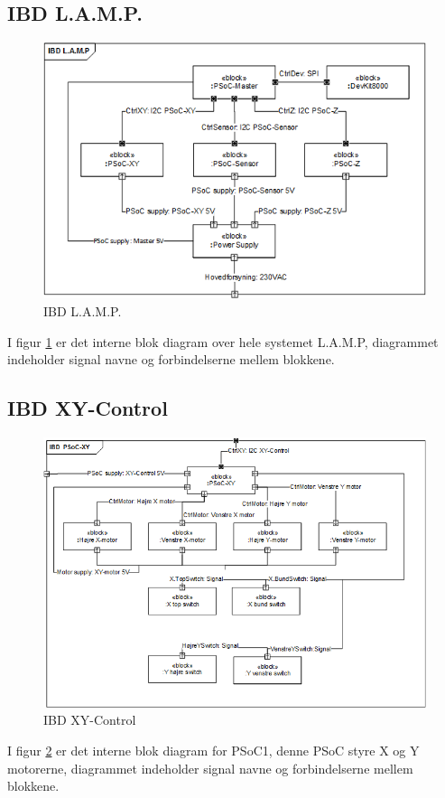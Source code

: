 \subsection{IBD L.A.M.P.}
\begin{figure}[H] \centering
    \includegraphics[width=\textwidth]{0_Filer/Figuer/5_HW_Design/IBD_LAMP_vers3.png}
    \caption{IBD L.A.M.P.}
    \label{fig:ibdLAMP}
\end{figure}
I figur \ref{fig:ibdLAMP} er det interne blok diagram over hele systemet L.A.M.P, diagrammet indeholder signal navne og forbindelserne mellem blokkene.

\subsection{IBD XY-Control}
\begin{figure}[H] \centering
    \includegraphics[width=\textwidth]{0_Filer/Figuer/5_HW_Design/IBD_PSoC1_vers3.png}
    \caption{IBD XY-Control}
    \label{fig:ibdXY}
\end{figure}
I figur \ref{fig:ibdXY} er det interne blok diagram for PSoC1, denne PSoC styre X og Y motorerne, diagrammet indeholder signal navne og forbindelserne mellem blokkene.

